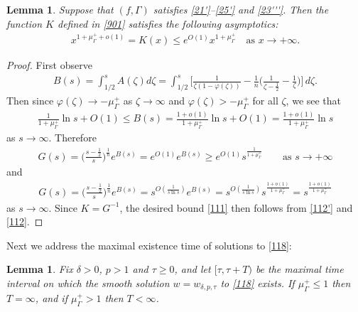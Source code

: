 \documentclass[12pt]{article}
\numberwithin{equation}{section}
\theoremstyle{plain}
\newtheorem{lem}[thm]{Lemma}
\theoremstyle{definition}
\renewcommand{\phi}{\varphi}
\begin{document}
	\begin{lem}\label{904}
		Suppose that $(f,\Gamma)$ satisfies \eqref{21'}--\eqref{25'} and \eqref{23'''}. Then the function $K$ defined in \eqref{901} satisfies the following asymptotics:
		\begin{align}\label{111}
		x^{1+\mu_\Gamma^+ + o(1)} = K(x) \leq  e^{O(1)}x^{1+\mu_\Gamma^+}  \quad \text{as }x\rightarrow+\infty.
		\end{align}
	\end{lem}
	\begin{proof}
	First observe
	 \begin{align*}
	B(s) = \int_{1/2}^s A(\zeta)d\zeta = \int_{1/2}^s \bigg[\frac{1}{\zeta(1-\phi(\zeta))} - \frac{1}{n}\bigg(\frac{1}{\zeta - \frac{1}{2}} - \frac{1}{\zeta}\bigg)\bigg]\,d\zeta. 
	\end{align*}
	Then since $\phi(\zeta)\rightarrow-\mu_\Gamma^+$ as $\zeta\rightarrow\infty$ and $\phi(\zeta) > -\mu_\Gamma^+$ for all $\zeta$, we see that
	\begin{align*}
	\frac{1}{1+\mu_\Gamma^+} \ln s + O(1) \leq B(s) = \frac{1+o(1)}{1+\mu_\Gamma^+}\ln s + O(1) = \frac{1+o(1)}{1+\mu_\Gamma^+}\ln s 
	\end{align*} 
	as $s\rightarrow\infty$. Therefore
	\begin{align}\label{112'}
	G(s) = \bigg(\frac{s-\frac{1}{2}}{s}\bigg)^{\frac{1}{n}}e^{B(s)}  = e^{O(1)}e^{B(s)} \geq e^{O(1)}s^{\frac{1}{1+\mu_\Gamma^+}} \quad \quad \text{as }s\rightarrow+\infty
	\end{align}
	and
	\begin{align}\label{112}
	G(s) = \bigg(\frac{s-\frac{1}{2}}{s}\bigg)^{\frac{1}{n}} e^{B(s)} = s^{O(\frac{1}{s\ln s})}e^{B(s)} = s^{O(\frac{1}{s\ln s})}s^{\frac{1+o(1)}{1+\mu_\Gamma^+}}= s^{\frac{1+o(1)}{1+\mu_\Gamma^+}}
	\end{align}
	as $s\rightarrow\infty$. 
	Since $K=G^{-1}$, the desired bound \eqref{111} then follows from \eqref{112'} and \eqref{112}. 
\end{proof}

Next we address the maximal existence time of solutions to \eqref{118}:

\begin{lem}\label{p3}
	Fix $\delta>0$, $p>1$ and $\tau \geq 0$, and let $[\tau,\tau+T)$ be the maximal time interval on which the smooth solution $w = w_{\delta,p,\tau}$ to \eqref{118} exists. If $\mu_\Gamma^+ \leq 1$ then $T=\infty$, and if $\mu_\Gamma^+ >1$ then $T<\infty$. 
\end{lem}
\end{document}
